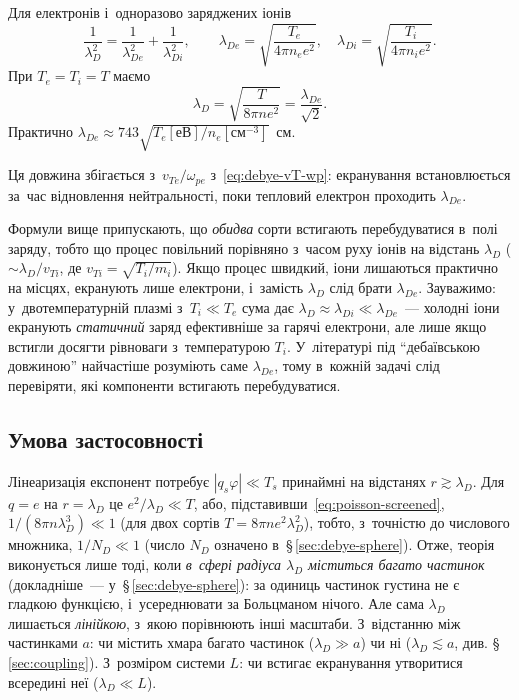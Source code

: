 Для електронів і~одноразово заряджених іонів
\begin{equation*}
	\frac1{\lambda_D^2}=\frac1{\lambda_{De}^2}+\frac1{\lambda_{Di}^2},
	\qquad
	\lambda_{De}=\sqrt{\frac{T_e}{4\pi n_ee^2}},
	\quad
	\lambda_{Di}=\sqrt{\frac{T_i}{4\pi n_ie^2}}.
\end{equation*}
При $T_e=T_i=T$ маємо
\begin{equation}\label{eq:debye-radius}
	\lambda_D=\sqrt{\frac{T}{8\pi ne^2}}=\frac{\lambda_{De}}{\sqrt2}.
\end{equation}
Практично $\lambda_{De}\approx743\sqrt{T_e[\text{еВ}]/n_e[\mathrm{см}^{-3}]}$~см.

Ця довжина збігається з~$v_{Te}/\omega_{pe}$ з~\eqref{eq:debye-vT-wp}: екранування встановлюється за~час
відновлення нейтральності, поки тепловий електрон проходить $\lambda_{De}$.

Формули вище припускають, що \emph{обидва} сорти встигають перебудуватися в~полі заряду, тобто що процес
повільний порівняно з~часом руху іонів на відстань $\lambda_D$ ($\sim\lambda_D/v_{Ti}$, де $v_{Ti}=\sqrt{T_i/m_i}$). Якщо процес швидкий,
іони лишаються практично на місцях, екранують лише електрони, і~замість $\lambda_D$ слід брати $\lambda_{De}$.
Зауважимо: у~двотемпературній плазмі з~$T_i\ll T_e$ сума дає $\lambda_D\approx\lambda_{Di}\ll\lambda_{De}$~---
холодні іони екранують \emph{статичний} заряд ефективніше за гарячі електрони, але лише якщо встигли досягти
рівноваги з~температурою $T_i$. У~літературі під \enquote{дебаївською довжиною} найчастіше розуміють саме
$\lambda_{De}$, тому в~кожній задачі слід перевіряти, які компоненти встигають перебудуватися.


\subsection*{Умова застосовності}


Лінеаризація експонент потребує $|q_s\varphi|\ll T_s$ принаймні на відстанях
$r\gtrsim\lambda_D$. Для $q=e$ на $r=\lambda_D$ це $e^2/\lambda_D\ll T$, або,
підставивши~\eqref{eq:poisson-screened}, $1/(8\pi n\lambda_D^3)\ll1$ (для двох сортів $T=8\pi ne^2\lambda_D^2$), тобто, з~точністю до числового множника, $1/N_D\ll1$ (число $N_D$ означено в~§\,\ref{sec:debye-sphere}).
Отже, теорія виконується лише тоді, коли \emph{в~сфері радіуса $\lambda_D$ міститься багато частинок}
(докладніше~--- у~§\,\ref{sec:debye-sphere}): за одиниць частинок густина не є гладкою функцією, і~усереднювати за Больцманом нічого.
Але сама $\lambda_D$ лишається \emph{лінійкою}, з~якою порівнюють інші масштаби.
З~відстанню між частинками $a$: чи містить хмара багато частинок ($\lambda_D\gg a$)
чи ні ($\lambda_D\lesssim a$, див. §\,\ref{sec:coupling}). З~розміром системи $L$: чи встигає
екранування утворитися всередині неї ($\lambda_D\ll L$).


